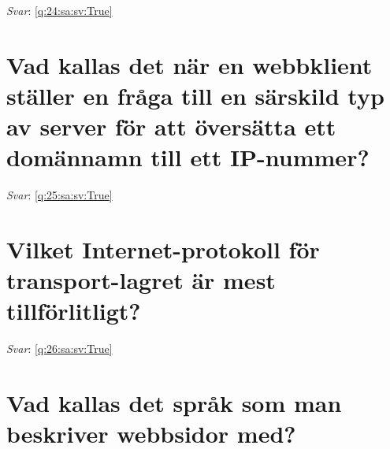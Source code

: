 \documentclass[a4paper,11pt,oneside]{book}
\begin{document}
\begin{sloppypar}
\label{q:24:sa:sv:False}

\vspace{2cm}

\noindent\makebox[\textwidth]{\hrulefill}

\vspace{1cm}

\textit{Svar}: \autoref{q:24:sa:sv:True}



\section{Vad kallas det n\"ar en webbklient st\"aller en fr\r{a}ga till en s\"arskild typ av server f\"or att \"overs\"atta ett dom\"annamn till ett IP-nummer?}

\label{q:25:sa:sv:False}

\vspace{2cm}

\noindent\makebox[\textwidth]{\hrulefill}

\vspace{1cm}

\textit{Svar}: \autoref{q:25:sa:sv:True}



\section{Vilket Internet-protokoll f\"or transport-lagret \"ar mest tillf\"orlitligt?}

\label{q:26:sa:sv:False}

\vspace{2cm}

\noindent\makebox[\textwidth]{\hrulefill}

\vspace{1cm}

\textit{Svar}: \autoref{q:26:sa:sv:True}



\section{Vad kallas det spr\r{a}k som man beskriver webbsidor med?}

\label{q:27:sa:sv:False}

\vspace{2cm}

\noindent\makebox[\textwidth]{\hrulefill}

\vspace{1cm}


\end{sloppypar}
\end{document}
